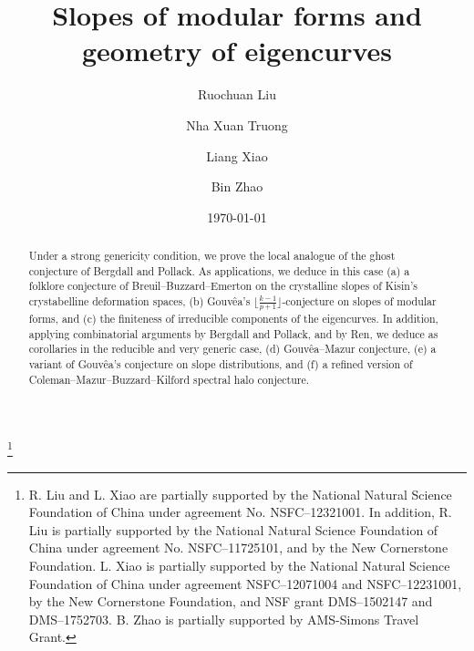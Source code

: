 \documentclass[12pt]{amsart}
\theoremstyle{definition}
\numberwithin{equation}{subsection}
\begin{document}
 
\title{Slopes of modular forms and geometry of eigencurves}
\author{Ruochuan Liu}
\address{Ruochuan Liu, New Cornerstone Science Laboratory, School of Mathematical Sciences, Peking University, 5 Yi He Yuan Road, Haidian District, Beijing, 100871, China. }

\author{Nha Xuan Truong}
\address{Nha Xuan Truong, Beijing International Center for Mathematical Researches, Peking University, 5 Yi He Yuan Road, Haidian District, Beijing, 100871, China.}

\author{Liang Xiao}
\address{Liang Xiao, New Cornerstone Science Laboratory, School of Mathematical Sciences,
Peking University, 5 Yi He Yuan Road, Haidian District,
	Beijing, 100871, China.}

\author{Bin Zhao}
\address{Bin Zhao, School of Mathematical Sciences, Capital Normal University, Beijing, 100048, China.}
\date{\today}

\begin{abstract}
Under a strong genericity condition, we prove the local analogue of the ghost conjecture of Bergdall and Pollack. As applications, we deduce in this case (a) a folklore conjecture of Breuil--Buzzard--Emerton on the crystalline slopes of Kisin's crystabelline deformation spaces, (b) Gouv\^ea's $\lfloor\frac{k-1}{p+1}\rfloor$-conjecture on slopes of modular forms,  and (c)  the finiteness of irreducible components of the eigencurves.
In addition, applying combinatorial arguments by Bergdall and Pollack, and by Ren, we deduce as corollaries in the reducible and very generic case,  (d) Gouv\^ea--Mazur conjecture, (e) a variant of Gouv\^ea's conjecture on slope distributions, and (f) a refined version of Coleman--Mazur--Buzzard--Kilford spectral halo conjecture.
\end{abstract}
\thanks{R. Liu and L. Xiao are partially supported by the National Natural Science Foundation of China under agreement No. NSFC--12321001. In addition, R. Liu is partially supported by the National Natural Science Foundation of China under agreement No. NSFC--11725101, and by the New Cornerstone Foundation. 
L. Xiao is  partially supported by the National Natural Science Foundation of China under agreement NSFC--12071004 and NSFC--12231001, by the New Cornerstone Foundation, and NSF grant DMS--1502147 and DMS--1752703. B. Zhao is partially supported by
AMS-Simons Travel Grant.}  
\end{document}
